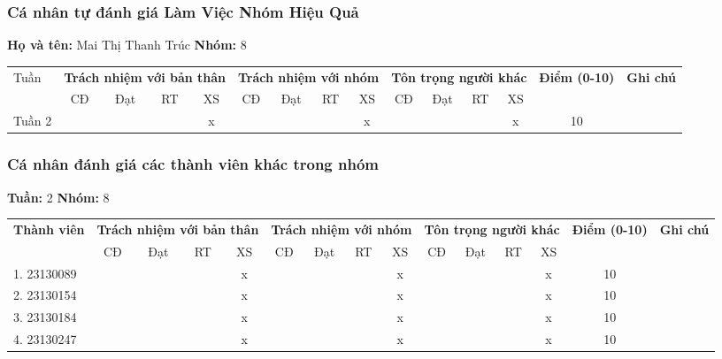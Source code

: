 \subsubsection*{Cá nhân tự đánh giá Làm Việc Nhóm Hiệu Quả}

\noindent \textbf{Họ và tên:} Mai Thị Thanh Trúc \hrulefill \quad \textbf{Nhóm:} 8 \hrulefill

\vspace{0.5cm}

\begin{tabularx}{\linewidth}{|X|c|c|c|c|c|c|c|c|c|c|c|c|c|c|}
\hline
Tuần & \multicolumn{4}{c|}{\textbf{Trách nhiệm với bản thân}} & \multicolumn{4}{c|}{\textbf{Trách nhiệm với nhóm}} & \multicolumn{4}{c|}{\textbf{Tôn trọng người khác}} & \multirow{2}{1.5cm}{\textbf{Điểm (0-10)}} & \multirow{2}{1.5cm}{\textbf{Ghi chú}} \\ \cline{2-13}
 & CĐ & Đạt & RT & XS & CĐ & Đạt & RT & XS & CĐ & Đạt & RT & XS & & \\ \hline
  Tuần 2 & & & & x & & & & x & & & & x & 10 & \\ \hline
\end{tabularx}

\vspace{1cm}

\subsubsection*{Cá nhân đánh giá các thành viên khác trong nhóm}

\noindent \textbf{Tuần:} 2 \hrulefill \quad \textbf{Nhóm:} 8 \hrulefill

\vspace{0.5cm}

\begin{tabularx}{\linewidth}{|X|c|c|c|c|c|c|c|c|c|c|c|c|c|c|}
\hline
\multirow{2}{3cm}{\textbf{Thành viên}} & \multicolumn{4}{c|}{\textbf{Trách nhiệm với bản thân}} & \multicolumn{4}{c|}{\textbf{Trách nhiệm với nhóm}} & \multicolumn{4}{c|}{\textbf{Tôn trọng người khác}} & \multirow{2}{1.2cm}{\textbf{Điểm (0-10)}} & \multirow{2}{1.5cm}{\textbf{Ghi chú}} \\ \cline{2-13}
 & CĐ & Đạt & RT & XS & CĐ & Đạt & RT & XS & CĐ & Đạt & RT & XS & & \\ \hline
1. 23130089 & & & & x & & & & x & & & & x & 10 & \\ \hline
2. 23130154 & & & & x & & & & x & & & & x & 10 & \\ \hline
3. 23130184 & & & & x & & & & x & & & & x & 10 & \\ \hline
4. 23130247 & & & & x & & & & x & & & & x & 10 & \\ \hline
\end{tabularx}
